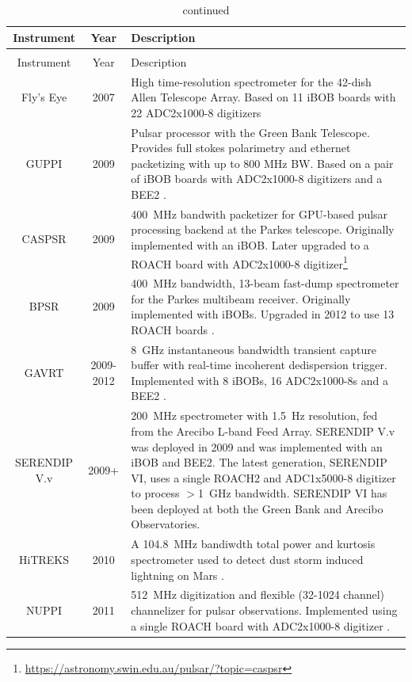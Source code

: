 \documentclass{ws-jai}
\begin{document}
\begin{longtable}{ccp{10cm}}
  \caption{Spectrometers and packetizers powered by CASPER hardware.}\\
  Instrument & Year & Description \\
  \hline \endfirsthead
  \caption[]{continued}\\
  Instrument & Year & Description \\
  \hline \endhead
  Fly's Eye        & 2007 & High time-resolution spectrometer for the 42-dish Allen Telescope Array. Based on 11 iBOB boards with 22 ADC2x1000-8 digitizers \citep{flyseye} \\
  GUPPI            & 2009 & Pulsar processor with the Green Bank Telescope. Provides full stokes polarimetry and ethernet packetizing with up to 800 MHz BW. Based on a pair of iBOB boards with ADC2x1000-8 digitizers and a BEE2 \citep{guppi}. \\
  CASPSR           & 2009 & 400~MHz bandwith packetizer for GPU-based pulsar processing backend at the Parkes telescope. Originally implemented with an iBOB. Later upgraded to a ROACH board with ADC2x1000-8 digitizer\footnote{\url{https://astronomy.swin.edu.au/pulsar/?topic=caspsr}} \\
  BPSR             & 2009 & 400~MHz bandwidth, 13-beam fast-dump spectrometer for the Parkes multibeam receiver. Originally implemented with iBOBs. Upgraded in 2012 to use 13 ROACH boards \citep{mcmahon-thesis, 2010MNRAS.409..619K}. \\
  GAVRT            & 2009-2012 & 8~GHz instantaneous bandwidth transient capture buffer with real-time incoherent dedispersion trigger. Implemented with 8 iBOBs, 16 ADC2x1000-8s and a BEE2 \citep{jon10, JonesDSS28}. \\
  SERENDIP V.v     & 2009+ & 200~MHz spectrometer with 1.5~Hz resolution, fed from the Arecibo L-band Feed Array. SERENDIP V.v was deployed in 2009 \citep{seti} and was implemented with an iBOB and BEE2. The latest generation, SERENDIP VI, uses a single ROACH2 and ADC1x5000-8 digitizer to process $>$1~GHz bandwidth. SERENDIP VI has been deployed at both the Green Bank and Arecibo Observatories. \\
  HiTREKS          & 2010 & A 104.8~MHz bandiwdth total power and kurtosis spectrometer used to detect dust storm induced lightning on Mars \citep{mars-lightning}. \\
  NUPPI            & 2011 & 512~MHz digitization and flexible (32-1024 channel) channelizer for pulsar observations. Implemented using a single ROACH board with ADC2x1000-8 digitizer \citep{2014MNRAS.443.3752L}. \\

\end{longtable}
\end{document}
